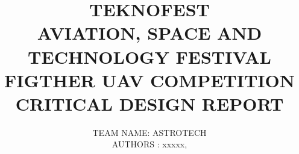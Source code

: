 \documentclass[12pt]{article}
\begin{document}


\begin{titlepage}
    \centering

	\title{ %
		TEKNOFEST \\
		AVIATION, SPACE AND TECHNOLOGY FESTIVAL \\
		FIGTHER UAV COMPETITION \\
		CRITICAL DESIGN REPORT \\}
	\author{
		TEAM NAME: ASTROTECH \\
		AUTHORS : xxxxx,\\} %
	\date{}
	\maketitle
\end{titlepage}	


\clearpage
{}
\tableofcontents %

\clearpage
\end{document}
